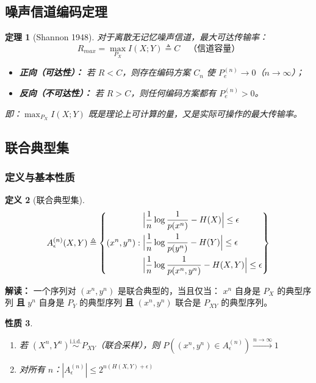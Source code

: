 \documentclass[12pt,a4paper]{ctexart}
\newtheorem{theorem}{定理}[section]
\newtheorem{property}[theorem]{性质}
\theoremstyle{definition}
\newtheorem{definition}[theorem]{定义}
\newcommand{\iid}{\overset{\text{i.i.d.}}{\sim}}
\begin{document}
\subsection{噪声信道编码定理}

\begin{theorem}[Shannon 1948]
对于离散无记忆噪声信道，最大可达传输率：
\[
R_{max} = \max_{P_X} I(X;Y) \triangleq C \quad\text{（信道容量）}
\]
\begin{itemize}[nosep]
  \item \textbf{正向（可达性）：} 若 $R < C$，则存在编码方案 $C_n$ 使 $P_e^{(n)} \to 0$（$n \to \infty$）；
  \item \textbf{反向（不可达性）：} 若 $R > C$，则任何编码方案都有 $P_e^{(n)} > 0$。
\end{itemize}
即：$\max_{P_X} I(X;Y)$ 既是理论上可计算的量，又是实际可操作的最大传输率。
\end{theorem}

\subsection{联合典型集}

\subsubsection{定义与基本性质}

\begin{definition}[联合典型集]
\[
A_\epsilon^{(n)}(X,Y) \triangleq \left\{
(x^n,y^n): \begin{aligned}
&\Bigl|\frac{1}{n}\log\frac{1}{p(x^n)} - H(X)\Bigr| \leq \epsilon \\
&\Bigl|\frac{1}{n}\log\frac{1}{p(y^n)} - H(Y)\Bigr| \leq \epsilon \\
&\Bigl|\frac{1}{n}\log\frac{1}{p(x^n,y^n)} - H(X,Y)\Bigr| \leq \epsilon
\end{aligned}\right\}
\]
\end{definition}

\textbf{解读：} 一个序列对 $(x^n,y^n)$ 是联合典型的，当且仅当：
$x^n$ 自身是 $P_X$ 的典型序列 \textbf{且} $y^n$ 自身是 $P_Y$ 的典型序列
\textbf{且} $(x^n,y^n)$ 联合是 $P_{XY}$ 的典型序列。

\begin{property}
\begin{enumerate}[label=(\arabic*),nosep]
  \item 若 $(X^n,Y^n) \iid P_{XY}$（联合采样），则 $P((x^n,y^n) \in A_\epsilon^{(n)}) \xrightarrow{n\to\infty} 1$
  \item 对所有 $n$：$|A_\epsilon^{(n)}| \leq 2^{n(H(X,Y)+\epsilon)}$
\end{enumerate}
\end{property}
\end{document}
